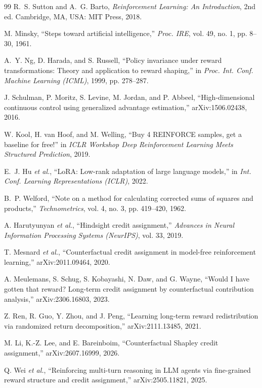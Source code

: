 \documentclass[conference]{IEEEtran}
\begin{document}
\begin{thebibliography}{99}
 R.~S. Sutton and A.~G. Barto, \emph{Reinforcement Learning: An Introduction}, 2nd ed. Cambridge, MA, USA: MIT Press, 2018.

 M. Minsky, ``Steps toward artificial intelligence,'' \emph{Proc. IRE}, vol. 49, no. 1, pp. 8--30, 1961.

 A.~Y. Ng, D. Harada, and S. Russell, ``Policy invariance under reward transformations: Theory and application to reward shaping,'' in \emph{Proc. Int. Conf. Machine Learning (ICML)}, 1999, pp. 278--287.

 J. Schulman, P. Moritz, S. Levine, M. Jordan, and P. Abbeel, ``High-dimensional continuous control using generalized advantage estimation,'' arXiv:1506.02438, 2016.

 W. Kool, H. van Hoof, and M. Welling, ``Buy 4 REINFORCE samples, get a baseline for free!'' in \emph{ICLR Workshop Deep Reinforcement Learning Meets Structured Prediction}, 2019.

 E.~J. Hu \emph{et al.}, ``LoRA: Low-rank adaptation of large language models,'' in \emph{Int. Conf. Learning Representations (ICLR)}, 2022.

 B.~P. Welford, ``Note on a method for calculating corrected sums of squares and products,'' \emph{Technometrics}, vol. 4, no. 3, pp. 419--420, 1962.

 A. Harutyunyan \emph{et al.}, ``Hindsight credit assignment,'' \emph{Advances in Neural Information Processing Systems (NeurIPS)}, vol. 33, 2019.

 T. Mesnard \emph{et al.}, ``Counterfactual credit assignment in model-free reinforcement learning,'' arXiv:2011.09464, 2020.

 A. Meulemans, S. Schug, S. Kobayashi, N. Daw, and G. Wayne, ``Would I have gotten that reward? Long-term credit assignment by counterfactual contribution analysis,'' arXiv:2306.16803, 2023.

 Z. Ren, R. Guo, Y. Zhou, and J. Peng, ``Learning long-term reward redistribution via randomized return decomposition,'' arXiv:2111.13485, 2021.

 M. Li, K.-Z. Lee, and E. Bareinboim, ``Counterfactual Shapley credit assignment,'' arXiv:2607.16999, 2026.

 Q. Wei \emph{et al.}, ``Reinforcing multi-turn reasoning in LLM agents via fine-grained reward structure and credit assignment,'' arXiv:2505.11821, 2025.


\end{thebibliography}
\end{document}

